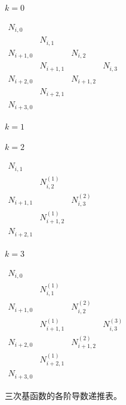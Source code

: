 \documentclass[../main.tex]{subfiles}
\begin{document}
\begin{center}
\begin{minipage}{24cm}
\vspace*{.6\baselineskip}\centering
\begin{minipage}[t]{10cm}
\vspace{0pt}\centering\small
\(k=0\)\par\smallskip
\(
\begin{array}{cccc}
N_{i,0} &  &  & \\
 & N_{i,1} &  & \\
N_{i+1,0} &  & N_{i,2} & \\
 & N_{i+1,1} &  & N_{i,3}\\
N_{i+2,0} &  & N_{i+1,2} & \\
 & N_{i+2,1} &  & \\
N_{i+3,0} &  &  & 
\end{array}
\)
\end{minipage}
\hspace{1cm}
\begin{minipage}[t]{10cm}
\vspace{0pt}\centering\small
\(k=1\)\par\smallskip
{}
\end{minipage}
\par\medskip
\begin{minipage}[t]{10cm}
\vspace{0pt}\centering\small
\(k=2\)\par\smallskip
\(
\begin{array}{ccc}
N_{i,1} &  & \\
 & N_{i,2}^{(1)} & \\
N_{i+1,1} &  & N_{i,3}^{(2)}\\
 & N_{i+1,2}^{(1)} & \\
N_{i+2,1} &  & 
\end{array}
\)
\end{minipage}
\hspace{1cm}
\begin{minipage}[t]{10cm}
\vspace{0pt}\centering\small
\(k=3\)\par\smallskip
\(
\begin{array}{cccc}
N_{i,0} &  &  & \\
 & N_{i,1}^{(1)} &  & \\
N_{i+1,0} &  & N_{i,2}^{(2)} & \\
 & N_{i+1,1}^{(1)} &  & N_{i,3}^{(3)}\\
N_{i+2,0} &  & N_{i+1,2}^{(2)} & \\
 & N_{i+2,1}^{(1)} &  & \\
N_{i+3,0} &  &  & 
\end{array}
\)
\end{minipage}
\par\smallskip
三次基函数的各阶导数递推表。
\end{minipage}
\end{center}
\end{document}

